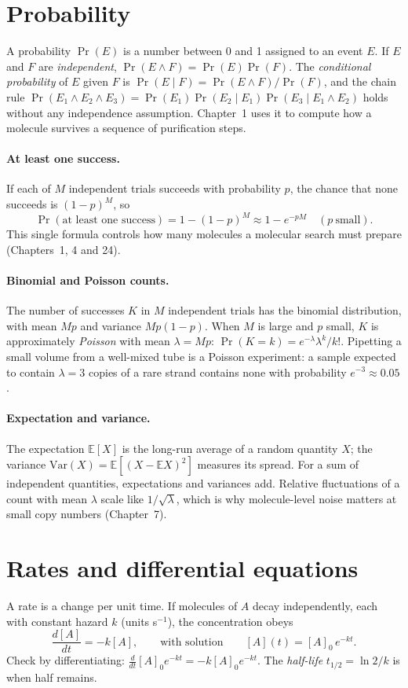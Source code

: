 \section{Probability}
A probability $\Pr(E)$ is a number between 0 and 1 assigned to an event $E$.
If $E$ and $F$ are \emph{independent}, $\Pr(E\land F)=\Pr(E)\Pr(F)$. The
\emph{conditional probability} of $E$ given $F$ is
$\Pr(E\mid F)=\Pr(E\land F)/\Pr(F)$, and the chain rule
$\Pr(E_1\land E_2\land E_3)=\Pr(E_1)\Pr(E_2\mid E_1)\Pr(E_3\mid E_1\land E_2)$
holds without any independence assumption. Chapter~1 uses it to compute how a
molecule survives a sequence of purification steps.

\paragraph{At least one success.} If each of $M$ independent trials succeeds
with probability $p$, the chance that none succeeds is $(1-p)^M$, so
\[
\Pr(\text{at least one success}) = 1-(1-p)^M \approx 1-e^{-pM}\quad(p\ \text{small}).
\]
This single formula controls how many molecules a molecular search must
prepare (Chapters~1, 4 and 24).

\paragraph{Binomial and Poisson counts.} The number of successes $K$ in $M$
independent trials has the binomial distribution, with mean $Mp$ and variance
$Mp(1-p)$. When $M$ is large and $p$ small, $K$ is approximately
\emph{Poisson} with mean $\lambda=Mp$: $\Pr(K=k)=e^{-\lambda}\lambda^k/k!$.
Pipetting a small volume from a well-mixed tube is a Poisson experiment: a
sample expected to contain $\lambda=3$ copies of a rare strand contains none
with probability $e^{-3}\approx0.05$.

\paragraph{Expectation and variance.} The expectation $\mathbb E[X]$ is the
long-run average of a random quantity $X$; the variance
$\mathrm{Var}(X)=\mathbb E[(X-\mathbb E X)^2]$ measures its spread. For a sum of
independent quantities, expectations and variances add. Relative fluctuations
of a count with mean $\lambda$ scale like $1/\sqrt{\lambda}$, which is why
molecule-level noise matters at small copy numbers (Chapter~7).

\section{Rates and differential equations}
A rate is a change per unit time. If molecules of $A$ decay independently,
each with constant hazard $k$ (units s$^{-1}$), the concentration obeys
\[
\frac{d[A]}{dt}=-k[A],\qquad\text{with solution}\qquad [A](t)=[A]_0\,e^{-kt}.
\]
Check by differentiating: $\tfrac{d}{dt}[A]_0e^{-kt}=-k[A]_0e^{-kt}$. The
\emph{half-life} $t_{1/2}=\ln2/k$ is when half remains.

